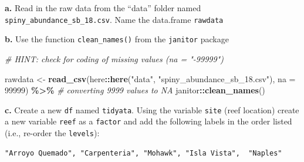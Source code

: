 \documentclass[
]{article}
\newenvironment{Shaded}{\begin{snugshade}}{\end{snugshade}}
\newcommand{\AttributeTok}[1]{\textcolor[rgb]{0.13,0.29,0.53}{#1}}
\newcommand{\CommentTok}[1]{\textcolor[rgb]{0.56,0.35,0.01}{\textit{#1}}}
\newcommand{\FunctionTok}[1]{\textcolor[rgb]{0.13,0.29,0.53}{\textbf{#1}}}
\newcommand{\NormalTok}[1]{#1}
\newcommand{\OtherTok}[1]{\textcolor[rgb]{0.56,0.35,0.01}{#1}}
\newcommand{\SpecialCharTok}[1]{\textcolor[rgb]{0.81,0.36,0.00}{\textbf{#1}}}
\newcommand{\StringTok}[1]{\textcolor[rgb]{0.31,0.60,0.02}{#1}}
\begin{document}
\textbf{a.} Read in the raw data from the ``data'' folder named
\texttt{spiny\_abundance\_sb\_18.csv}. Name the data.frame
\texttt{rawdata}

\textbf{b.} Use the function \texttt{clean\_names()} from the
\texttt{janitor} package

\begin{Shaded}
\begin{Highlighting}[]
\CommentTok{\# HINT: check for coding of missing values (\textasciigrave{}na = "{-}99999"\textasciigrave{})}

\NormalTok{rawdata }\OtherTok{\textless{}{-}} \FunctionTok{read\_csv}\NormalTok{(here}\SpecialCharTok{::}\FunctionTok{here}\NormalTok{(}\StringTok{"data"}\NormalTok{, }\StringTok{"spiny\_abundance\_sb\_18.csv"}\NormalTok{), }
                    \AttributeTok{na =} \StringTok{\textquotesingle{}{-}99999\textquotesingle{}}\NormalTok{) }\SpecialCharTok{\%\textgreater{}\%} \CommentTok{\# converting \textquotesingle{}{-}9999\textquotesingle{} values to NA }
\NormalTok{    janitor}\SpecialCharTok{::}\FunctionTok{clean\_names}\NormalTok{()}
\end{Highlighting}
\end{Shaded}

\textbf{c.} Create a new \texttt{df} named \texttt{tidyata}. Using the
variable \texttt{site} (reef location) create a new variable
\texttt{reef} as a \texttt{factor} and add the following labels in the
order listed (i.e., re-order the \texttt{levels}):

\begin{verbatim}
"Arroyo Quemado", "Carpenteria", "Mohawk", "Isla Vista",  "Naples"
\end{verbatim}

\begin{Shaded}
\end{Shaded}
\end{document}
